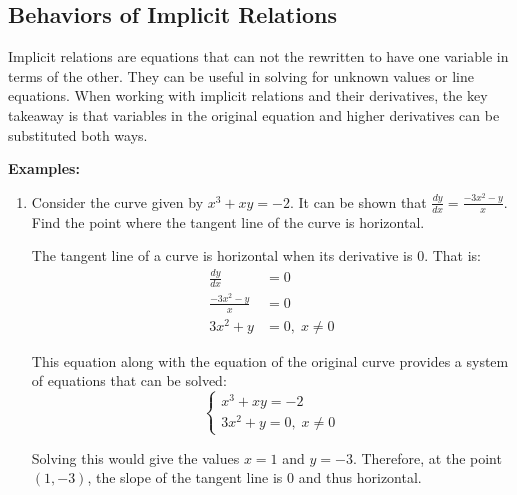 \subsection{Behaviors of Implicit Relations}
Implicit relations are equations that can not the rewritten to have one variable in terms of the other. They can be useful in solving for unknown values or line equations. When working with implicit relations and their derivatives, the key takeaway is that variables in the original equation and higher derivatives can be substituted both ways.

\noindent \textbf{Examples:}
\begin{enumerate}
	\item Consider the curve given by $x^3 + xy = -2$. It can be shown that $\frac{dy}{dx} = \frac{-3x^2 - y}{x}$. Find the point where the tangent line of the curve is horizontal.

	The tangent line of a curve is horizontal when its derivative is $0$. That is:
	\begin{align*}
		\frac{dy}{dx} &= 0 \\[5pt]
		\frac{-3x^2 - y}{x} &= 0 \\[5pt]
		3x^2 + y &= 0 , \; x \neq 0
	\end{align*}

	This equation along with the equation of the original curve provides a system of equations that can be solved:
	\[ \begin{cases}
		x^3 + xy = -2 \\
		3x^2 + y = 0 , \; x \neq 0
	\end{cases} \]

	Solving this would give the values $x = 1$ and $y = -3$. Therefore, at the point $(1, -3)$, the slope of the tangent line is $0$ and thus horizontal.
\end{enumerate}
